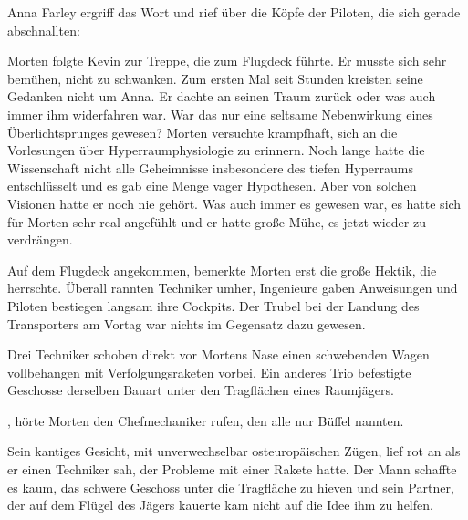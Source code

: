 \par

Anna Farley ergriff das Wort und rief über die Köpfe der Piloten, die sich gerade abschnallten: 

\par

Morten folgte Kevin zur Treppe, die zum Flugdeck führte. Er musste sich sehr bemühen, nicht zu schwanken. Zum ersten Mal seit Stunden kreisten seine Gedanken nicht um Anna. Er dachte an seinen Traum zurück oder was auch immer ihm widerfahren war. War das nur eine seltsame Nebenwirkung eines Überlichtsprunges gewesen? Morten versuchte krampfhaft, sich an die Vorlesungen über Hyperraumphysiologie zu erinnern. Noch lange hatte die Wissenschaft nicht alle Geheimnisse insbesondere des tiefen Hyperraums entschlüsselt und es gab eine Menge vager Hypothesen. Aber von solchen Visionen hatte er noch nie gehört. Was auch immer es gewesen war, es hatte sich für Morten sehr real angefühlt und er hatte große Mühe, es jetzt wieder zu verdrängen.

\par

Auf dem Flugdeck angekommen, bemerkte Morten erst die große Hektik, die herrschte. Überall rannten Techniker umher, Ingenieure gaben Anweisungen und Piloten bestiegen langsam ihre Cockpits. Der Trubel bei der Landung des Transporters am Vortag war nichts im Gegensatz dazu gewesen.

\par

Drei Techniker schoben direkt vor Mortens Nase einen schwebenden Wagen vollbehangen mit Verfolgungsraketen vorbei. Ein anderes Trio befestigte Geschosse derselben Bauart unter den Tragflächen eines Raumjägers.

\par

, hörte Morten den Chefmechaniker rufen, den alle nur Büffel nannten.

\par

Sein kantiges Gesicht, mit unverwechselbar osteuropäischen Zügen, lief rot an als er einen Techniker sah, der Probleme mit einer Rakete hatte. Der Mann schaffte es kaum, das schwere Geschoss unter die Tragfläche zu hieven und sein Partner, der auf dem Flügel des Jägers kauerte kam nicht auf die Idee ihm zu helfen.

